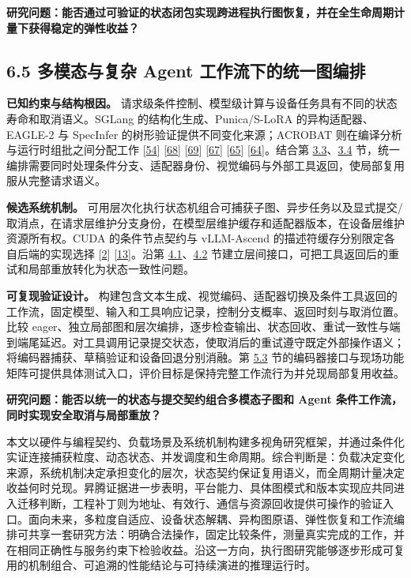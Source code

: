 \documentclass[UTF8,10.5pt,fontset=windows]{ctexart}
\begin{document}
\textbf{研究问题：能否通过可验证的状态闭包实现跨进程执行图恢复，并在全生命周期计量下获得稳定的弹性收益？}

\hypertarget{section-6-5}{%
\subsection{6.5 多模态与复杂 Agent
工作流下的统一图编排}\label{section-6-5}}

\textbf{已知约束与结构根因。}
请求级条件控制、模型级计算与设备任务具有不同的状态寿命和取消语义。SGLang
的结构化生成、Punica/S-LoRA 的异构适配器、EAGLE-2 与 SpecInfer
的树形验证提供不同变化来源；ACROBAT 则在编译分析与运行时组批之间分配工作
{[}\protect\hyperlink{ref-zheng2024sglang}{54}{]}
{[}\protect\hyperlink{ref-chen2024punica}{68}{]}
{[}\protect\hyperlink{ref-sheng2024slora}{69}{]}
{[}\protect\hyperlink{ref-li2024eagle2}{67}{]}
{[}\protect\hyperlink{ref-miao2024specinfer}{65}{]}
{[}\protect\hyperlink{ref-fegade2024acrobat}{64}{]}。结合第
\protect\hyperlink{section-3-3}{3.3}、\protect\hyperlink{section-3-4}{3.4}
节，统一编排需要同时处理条件分支、适配器身份、视觉编码与外部工具返回，使局部复用服从完整请求语义。

\textbf{候选系统机制。}
可用层次化执行状态机组合可捕获子图、异步任务以及显式提交/取消点，在请求层维护分支身份，在模型层维护缓存和适配器版本，在设备层维护资源所有权。CUDA
的条件节点契约与 vLLM-Ascend 的描述符缓存分别限定各自后端的实现选择
{[}\protect\hyperlink{ref-nvidia2026cuda1303}{2}{]}
{[}\protect\hyperlink{ref-vllmascend0130impl}{13}{]}。沿第
\protect\hyperlink{section-4-1}{4.1}、\protect\hyperlink{section-4-2}{4.2}
节建立层间接口，可把工具返回后的重试和局部重放转化为状态一致性问题。

\textbf{可复现验证设计。}
构建包含文本生成、视觉编码、适配器切换及条件工具返回的工作流，固定模型、输入和工具响应记录，控制分支概率、返回时刻与取消位置。比较
eager、独立局部图和层次编排，逐步检查输出、状态回收、重试一致性与端到端尾延迟。对工具调用记录提交状态，使取消后的重试遵守既定外部操作语义；将编码器捕获、草稿验证和设备回退分别消融。第
\protect\hyperlink{section-5-3}{5.3}
节的编码器接口与现场功能矩阵可提供具体测试入口，评价目标是保持完整工作流行为并兑现局部复用收益。

\textbf{研究问题：能否以统一的状态与提交契约组合多模态子图和 Agent
条件工作流，同时实现安全取消与局部重放？}

本文以硬件与编程契约、负载场景及系统机制构建多视角研究框架，并通过条件化实证连接捕获粒度、动态状态、并发调度和生命周期。综合判断是：负载决定变化来源，系统机制决定承担变化的层次，状态契约保证复用语义，而全周期计量决定收益何时兑现。昇腾证据进一步表明，平台能力、具体图模式和版本实现应共同进入迁移判断，工程补丁则为地址、有效行、通信与资源回收提供可操作的验证入口。面向未来，多粒度自适应、设备状态解耦、异构图原语、弹性恢复和工作流编排可共享一套研究方法：明确合法操作，固定比较条件，测量真实完成的工作，并在相同正确性与服务约束下检验收益。沿这一方向，执行图研究能够逐步形成可复用的机制组合、可追溯的性能结论与可持续演进的推理运行时。
\end{document}

